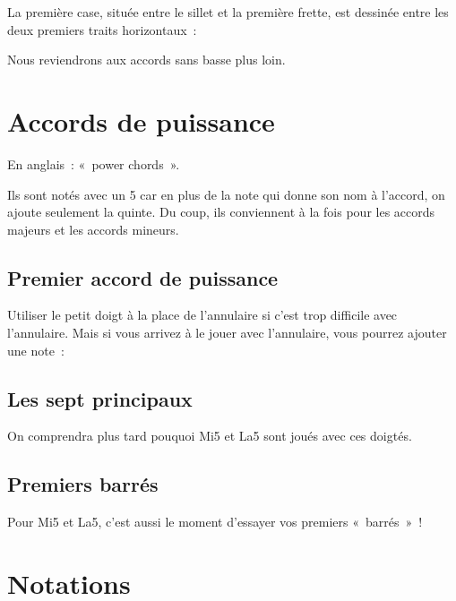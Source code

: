 \documentclass[11pt]{article}
\begin{document}
La première case, située entre le sillet et la première frette, est
dessinée entre les deux premiers traits horizontaux~:


Nous reviendrons aux accords sans basse plus loin.

\section{Accords de puissance}

En anglais~: «~power chords~».

Ils sont notés avec un 5 car en plus de la note qui donne son nom à l’accord,
on ajoute seulement la quinte. Du coup, ils conviennent à la fois pour les
accords majeurs et les accords mineurs.

\subsection{Premier accord de puissance}


Utiliser le petit doigt à la place de l’annulaire si c’est trop difficile avec
l’annulaire. Mais si vous arrivez à le jouer avec l’annulaire, vous pourrez
ajouter une note~:


\subsection{Les sept principaux}


On comprendra plus tard pouquoi Mi5 et La5 sont joués avec ces doigtés.

\subsection{Premiers barrés}

Pour Mi5 et La5, c’est aussi le moment d’essayer vos premiers «~barrés~»~!


\section{Notations}
\end{document}
